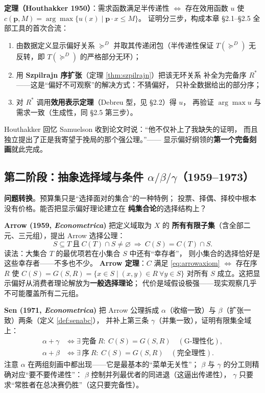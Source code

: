 \textbf{定理（Houthakker 1950）}：需求函数满足半传递性
$\iff$ 存在效用函数 $u$ 使 $c(\boldsymbol{p},M)=
\arg\max\{u(x)\mid \boldsymbol{p}\cdot x\le M\}$。
证明分三步，构成本章 §2.1--§2.5 全部工具的首次合流：
\begin{enumerate}
  \item 由数据定义显示偏好关系 $\succeq^D$ 并取其传递闭包（半传递性保证
  $T(\succeq^D)$ 无反转，即 $T(\succeq^D)$ 的严格部分无环）；
  \item 用 \textbf{Szpilrajn 序扩张}（定理 \ref{thm:szpilrajn}）把该无环关系
  补全为完备序 $R^*$——这是“偏好不可观察”的解决方式：不猜偏好，
  只补全数据给出的部分序；
  \item 对 $R^*$ 调用\textbf{效用表示定理}（Debreu 型，见 §2.2）得 $u$，
  再验证 $\arg\max u$ 与需求一致（生成性，同 §2.5 第三步）。
\end{enumerate}
Houthakker 回忆 Samuelson 收到论文时说：“他不仅补上了我缺失的证明，
而且独立提出了正是我寄望于挽局的那个强公理。”——
显示偏好纲领的\textbf{第一个完备刻画}就此完成。

\subsection{第二阶段：抽象选择域与条件 \texorpdfstring{$\alpha/\beta/\gamma$}{α/β/γ}（1959--1973）}

\textbf{问题转换}。预算集只是“选择面对的集合”的一种特例；
投票、择偶、择校中根本没有价格。能否把显示偏好理论建立在
\textbf{纯集合论}的选择结构上？

\textbf{Arrow (1959, \emph{Econometrica})} 把定义域取为 $X$ 的
\textbf{所有有限子集}（含全部二元、三元组），提出 Arrow 选择公理：
\begin{equation}
S\subseteq T\ \text{且}\ C(T)\cap S\neq\varnothing
\ \Longrightarrow\
C(S)=C(T)\cap S.
\label{eq:arrowaxiom}
\end{equation}
读法：大集合 $T$ 的最优项若在小集合 $S$ 中还有“幸存者”，
则小集合的选择恰好是这些幸存者——不多也不少。
\textbf{Arrow 定理}：$C$ 满足 \eqref{eq:arrowaxiom} $\iff$
存在序 $R$ 使 $C(S)=G(S,R)=\{x\in S\mid (x,y)\in R\ \forall y\in S\}$
对所有 $S$ 成立。这把显示偏好从消费者理论解放为\textbf{一般选择理论}；
代价是域假设极强——现实观察几乎不可能覆盖所有二元组。

\textbf{Sen (1971, \emph{Econometrica})} 把 Arrow 公理拆成
$\alpha$（收缩一致）与 $\beta$（扩张一致）两条（定义 \ref{def:senabc}），
并补上第三条 $\gamma$（并集一致），证明有限集全域上：
\begin{align}
\alpha+\gamma &\iff \exists\ \textbf{完备}\ R:\ C(S)=G(S,R)
\quad(\text{G-理性化}),\\
\alpha+\beta &\iff \exists\ \textbf{序}\ R:\ C(S)=G(S,R)
\quad(\text{完全理性}).
\end{align}
注意 $\alpha$ 在两组刻画中都出现——它是最基本的“菜单无关性”；
$\beta$ 与 $\gamma$ 的分工则精确对应“要不要传递性”：
$\beta$ 控制并列最优者的同进退（这逼出传递性），
$\gamma$ 只要求“常胜者在总决赛仍胜”（这只要完备性）。


